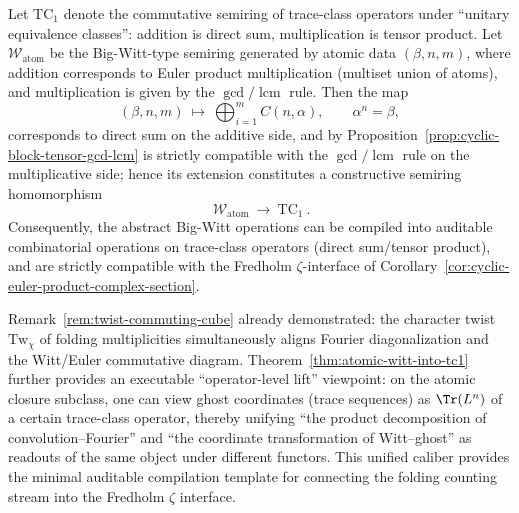 \begin{theorem}\label{thm:atomic-witt-into-tc1}
Let \(\mathrm{TC}_1\) denote the commutative semiring of trace-class operators under ``unitary equivalence classes'': addition is direct sum, multiplication is tensor product.
Let \(\mathcal{W}_{\mathrm{atom}}\) be the Big-Witt-type semiring generated by atomic data \((\beta,n,m)\), where addition corresponds to Euler product multiplication (multiset union of atoms), and multiplication is given by the \(\gcd/\operatorname{lcm}\) rule.
Then the map
\[
(\beta,n,m)\ \longmapsto\ \bigoplus_{i=1}^{m} C\!\left(n,\alpha\right),
\qquad \alpha^{n}=\beta,
\]
corresponds to direct sum on the additive side, and by Proposition~\ref{prop:cyclic-block-tensor-gcd-lcm} is strictly compatible with the \(\gcd/\operatorname{lcm}\) rule on the multiplicative side;
hence its extension constitutes a constructive semiring homomorphism
\[
\boxed{\ \mathcal{W}_{\mathrm{atom}}\ \longrightarrow\ \mathrm{TC}_1\ }.
\]
Consequently, the abstract Big-Witt operations can be compiled into auditable combinatorial operations on trace-class operators (direct sum/tensor product), and are strictly compatible with the Fredholm \(\zeta\)-interface of Corollary~\ref{cor:cyclic-euler-product-complex-section}.
\end{theorem}

\begin{remark}\label{rem:operator-fourier-witt-unification}
Remark~\ref{rem:twist-commuting-cube} already demonstrated: the character twist \(\mathrm{Tw}_\chi\) of folding multiplicities simultaneously aligns Fourier diagonalization and the Witt/Euler commutative diagram.
Theorem~\ref{thm:atomic-witt-into-tc1} further provides an executable ``operator-level lift'' viewpoint: on the atomic closure subclass, one can view ghost coordinates (trace sequences) as \(\Tr(L^n)\) of a certain trace-class operator,
thereby unifying ``the product decomposition of convolution--Fourier'' and ``the coordinate transformation of Witt--ghost'' as readouts of the same object under different functors.
This unified caliber provides the minimal auditable compilation template for connecting the folding counting stream into the Fredholm \(\zeta\) interface.
\end{remark}

\endinput
